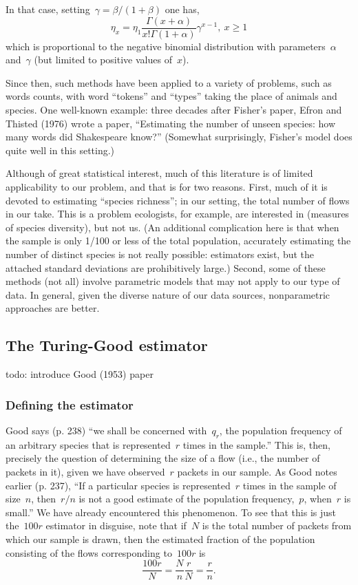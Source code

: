 \documentclass{paper}
\begin{document}
In that case, setting~$\gamma = \beta/(1+\beta)$ one has,
$$ \eta_x = \eta_1 \frac{\Gamma(x + \alpha)}{x!\Gamma(1+\alpha)}\gamma^{x-1},~x \geq 1 $$
which is proportional to the negative binomial distribution with
parameters~$\alpha$ and~$\gamma$ (but limited to positive values of~$x$).

Since then, such methods have been applied to a variety of problems, such as
words counts, with word ``tokens'' and ``types'' taking the place of animals and
species. One well-known example: three decades after Fisher's paper, Efron and
Thisted (1976) wrote a paper, ``Estimating the number of unseen species: how
many words did Shakespeare know?'' (Somewhat surprisingly, Fisher's model does
quite well in this setting.)

Although of great statistical interest, much of this literature is of limited
applicability to our problem, and that is for two reasons. First, much of it is
devoted to estimating ``species richness''; in our setting, the total number of
flows in our take. This is a problem ecologists, for example, are interested in
(measures of species diversity), but not us. (An additional complication here is
that when the sample is only 1/100 or less of the total population, accurately
estimating the number of distinct species is not really possible: estimators
exist, but the attached standard deviations are prohibitively large.) Second,
some of these methods (not all) involve parametric models that may not apply to
our type of data. In general, given the diverse nature of our data sources,
nonparametric approaches are better.

\subsection{The Turing-Good estimator}

todo: introduce Good (1953) paper

\subsubsection{Defining the estimator}\label{def_tg}

Good says (p. 238) ``we shall be concerned with~$q_r$, the population frequency
of an arbitrary species that is represented~$r$ times in the sample.'' This is,
then, precisely the question of determining the size of a flow (i.e., the number
of packets in it), given we have observed~$r$ packets in our sample. As Good
notes earlier (p. 237), ``If a particular species is represented~$r$ times in
the sample of size~$n$, then~$r/n$ is not a good estimate of the population
frequency,~$p$, when~$r$ is small.'' We have already encountered this
phenomenon. To see that this is just the~$100r$ estimator in disguise, note that
if~$N$ is the total number of packets from which our sample is drawn, then the
estimated fraction of the population consisting of the flows corresponding
to~$100r$ is $$ \frac{100r}{N} = \frac{N}{n}\frac{r}{N} = \frac{r}{n}. $$
\end{document}
